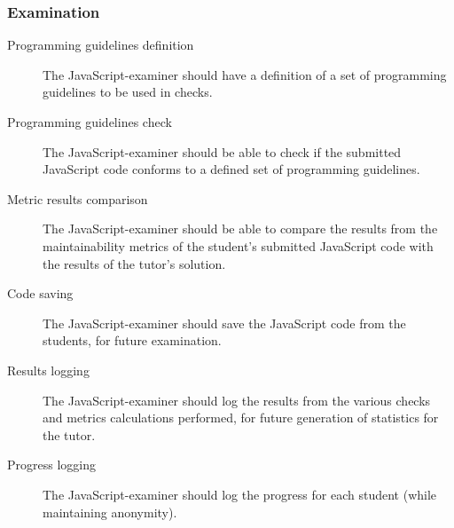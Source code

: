 \subsubsection{Examination}
\begin{description}
  \item[Programming guidelines definition] The JavaScript-examiner should have
    a definition of a set of programming guidelines to be used in \glspl{check}.
  \item[Programming guidelines check] The JavaScript-examiner should be able to
    check if the submitted JavaScript code conforms to a defined set of
    programming guidelines.
  \item[Metric results comparison] The JavaScript-examiner should be able to
    compare the results from the maintainability metrics of the student's
    submitted JavaScript code with the results of the tutor's solution.
  \item[Code saving] The JavaScript-examiner should save the JavaScript code
    from the students, for future examination.
  \item[Results logging] The JavaScript-examiner should log the results from
    the various \glspl{check} and metrics calculations performed, for future
    generation of statistics for the tutor.
  \item[Progress logging] The JavaScript-examiner should log the progress for each
    student (while maintaining anonymity).
\end{description}
